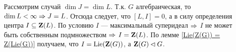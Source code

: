 \begin{subsection}{}
\begin{theorem}
{      Рассмотрим случай $ \dim J = \dim L $.
      Т.к. $ G $ алгебраическая, то $ \dim L < \infty \Rightarrow J = L $.
      Отсюда следует, что $ [L, I] = 0 $, а в силу определения центра $ I \subseteq \mathbf{Z}(L) $.
      По условию $ I $ --- максимальный суперидеал $ \Rightarrow $ $ I $ не может быть
      собственным подмножеством $ \Rightarrow $ $ I = \mathbf{Z}(L) $.
      По лемме \ref{Lie(Z(G)) = Z(Lie(G))} получаем, что $ I = \mathrm{Lie}(\mathbf{Z}(G)) $, а $ \mathbf{Z}(G) \lhd G $.
    \qedhere
    }
  \end{theorem}

\end{subsection}
